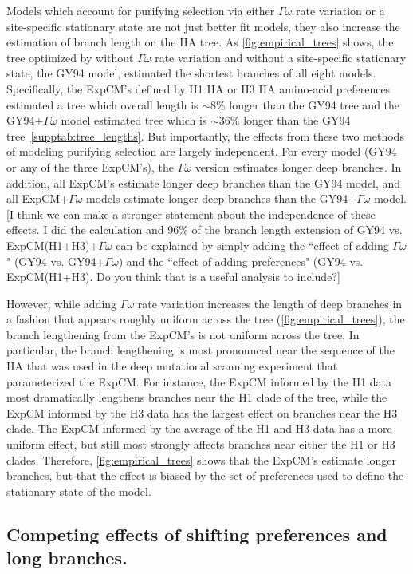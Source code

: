 \documentclass[11pt]{article}
\newcommand\skhcomment[1]{{\color{cyan}[#1]}}
\begin{document}
Models which account for purifying selection via either $\Gamma\omega$ rate variation or a site-specific stationary state are not just better fit models, they also increase the estimation of branch length on the HA tree. 
As \ref{fig:empirical_trees} shows, the tree optimized by without $\Gamma\omega$ rate variation and without a site-specific stationary state, the GY94 model, estimated the shortest branches of all eight models. 
Specifically, the ExpCM's defined by H1 HA or H3 HA amino-acid preferences estimated a tree which overall length is $\sim 8\%$ longer than the GY94 tree and the GY94+$\Gamma\omega$ model estimated tree which is $\sim 36\%$ longer than the GY94 tree~\ref{supptab:tree_lengths}. 
But importantly, the effects from these two methods of modeling purifying selection are largely independent.
For every model (GY94 or any of the three ExpCM's), the $\Gamma\omega$ version estimates longer deep branches.
In addition, all ExpCM's estimate longer deep branches than the GY94 model, and all ExpCM+$\Gamma\omega$ models estimate longer deep branches than the GY94+$\Gamma\omega$ model.
\skhcomment{I think we can make a stronger statement about the independence of these effects. I did the calculation and 96\% of the branch length extension of GY94 vs. ExpCM(H1+H3)+$\Gamma\omega$ can be explained by simply adding the ``effect of adding $\Gamma\omega$" (GY94 vs. GY94+$\Gamma\omega$) and the ``effect of adding preferences" (GY94 vs. ExpCM(H1+H3). Do you think that is a useful analysis to include?}

However, while adding $\Gamma\omega$ rate variation increases the length of deep branches in a fashion that appears roughly uniform across the tree (\ref{fig:empirical_trees}), the branch lengthening from the ExpCM's is not uniform across the tree. 
In particular, the branch lengthening is most pronounced near the sequence of the HA that was used in the deep mutational scanning experiment that parameterized the ExpCM.
For instance, the ExpCM informed by the H1 data most dramatically lengthens branches near the H1 clade of the tree, while the ExpCM informed by the H3 data has the largest effect on branches near the H3 clade.
The ExpCM informed by the average of the H1 and H3 data has a more uniform effect, but still most strongly affects branches near either the H1 or H3 clades.
Therefore, \ref{fig:empirical_trees} shows that the ExpCM's estimate longer branches, but that the effect is biased by the set of preferences used to define the stationary state of the model.

\subsection*{Competing effects of shifting preferences and long branches.}
\end{document}
